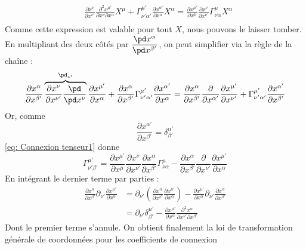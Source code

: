 \begin{align}
\label{eq: Connexion tenseur1}
    &\frac{\partial x^{\nu}}{\partial x^{\nu '}}\frac{\partial^2 x^{\mu'}}{\partial x^{\nu} \partial x^{\alpha}}X^{\mu} + \Gamma^{\mu '}_{\nu '\alpha '}\frac{\partial x^{\alpha '}}{\partial x^{\alpha }} X^{\alpha} = \frac{\partial x^{\mu'}}{\partial x^{\mu}}\frac{\partial x^{\nu}}{\partial x^{\nu '}}\Gamma^{\mu }_{\nu \alpha}X^{\alpha }\\
\end{align}
Comme cette expression est valable pour tout $X$, nous pouvons le laisser tomber. En multipliant des deux côtés par $\dfrac{\pd x^\alpha}{\pd x^{\beta'}}$, on peut simplifier via la règle de la chaîne :
\begin{align}
    \frac{\partial x^{\alpha}}{\partial x^{\beta '}} \overbrace{ \frac{\partial x^{\nu}}{\partial x^{\nu '}} \frac{\pd}{\pd x^\nu} }^{ \pd_{\nu'}} \frac{\partial x^{\mu'}}{ \partial x^{\alpha}} +\frac{\partial x^{\alpha}}{\partial x^{\beta '}} \Gamma^{\mu '}_{\nu '\alpha '}\frac{\partial x^{\alpha '}}{\partial x^{\alpha }} = \frac{\partial x^{\alpha}}{\partial x^{\beta '}}\frac{\partial }{\partial x^{\alpha '}} \frac{\partial x^{\mu'}}{ \partial x^{\nu'}} +\Gamma^{\mu '}_{\nu '\alpha '}\frac{\partial x^{\alpha '}}{\partial x^{\beta' }}
\end{align}
Or, comme 
\begin{equation}
    \frac{\partial x^{\alpha '}}{\partial x^{\beta' }} = \delta^{\alpha'}_{\beta'}
\end{equation}
\ref{eq: Connexion tenseur1} donne
\begin{equation}
    \Gamma^{\mu '}_{\nu '\beta '} = \frac{\partial x^{\mu'}}{\partial x^{\mu}}\frac{\partial x^{\nu}}{\partial x^{\nu '}}\frac{\partial x^{\alpha}}{\partial x^{\beta '}} \Gamma^{\mu}_{\nu \alpha} -\frac{\partial x^{\alpha}}{\partial x^{\beta '}}\frac{\partial }{\partial x^{\nu '}} \frac{\partial x^{\mu'}}{ \partial x^{\alpha}}
\end{equation}
En intégrant le dernier terme par parties :
\begin{align}
    \frac{\partial x^{\alpha}}{\partial x^{\beta '}}\partial_{\nu '} \frac{\partial x^{\mu '}}{\partial x^{\alpha}} &= \partial_{\nu '}\left(\frac{\partial x^{\alpha}}{\partial x^{\beta '}}\frac{\partial x^{\mu '}}{\partial x^{\alpha}}\right) - \frac{\partial x^{\mu '}}{\partial x^{\alpha}} \partial_{\nu '}\frac{\partial x^{\alpha}}{\partial x^{\beta '}} \\
    &= \partial_{\nu '} \delta^{\mu'}_{\beta'} - \frac{\partial x^{\mu '}}{\partial x^{\alpha}}\frac{\partial^2 x^{\alpha}}{\partial x^{\nu '}\partial x^{\beta '}} 
\end{align}
Dont le premier terme s'annule. On obtient finalement la loi de transformation générale de coordonnées pour les coefficients de connexion

